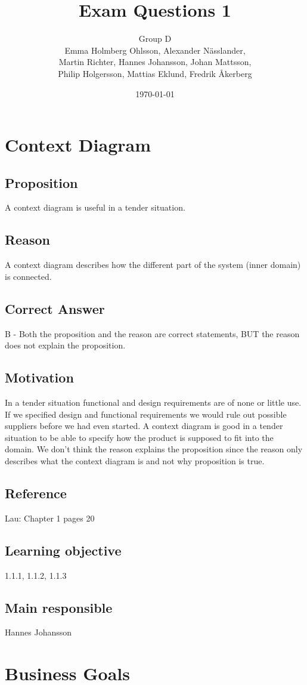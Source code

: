 \documentclass[a4paper]{article}
\title{Exam Questions 1}
\author{Group D\\ Emma Holmberg Ohlsson, Alexander Nässlander,\\Martin Richter, Hannes Johansson, Johan Mattsson,\\Philip Holgersson, Mattias Eklund, Fredrik Åkerberg}
\date{\today}
\begin{document}
	\maketitle
	\thispagestyle{empty}
	\setcounter{page}{0}
	\pagebreak

\section{Context Diagram}
\subsection*{Proposition}
A context diagram is useful in a tender situation.
\subsection*{Reason}
A context diagram describes how the different part of the system (inner domain) is connected.
\subsection*{Correct Answer}
B - Both the proposition and the reason are correct statements, BUT the reason does not explain the proposition.
\subsection*{Motivation}
In a tender situation functional and design requirements are of none or little use. If we specified design and functional requirements we would rule out possible suppliers before we had even started.
A context diagram is good in a tender situation to be able to specify how the product is supposed to fit into the domain.
We don't think the reason explains the proposition since the reason only describes what the context diagram is and not why proposition is true.
\subsection*{Reference}
Lau: Chapter 1 pages 20
\subsection*{Learning objective}
1.1.1, 1.1.2, 1.1.3
\subsection*{Main responsible}
Hannes Johansson


\section{Business Goals}
\end{document}
